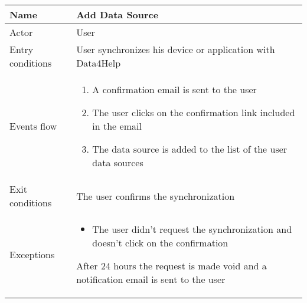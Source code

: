\begin{table}[h!]
    \begin{tabular}{|l|p{12cm}|}
        \hline
        Name             & Add Data Source \\ \hline
        Actor            & User \\ \hline
        Entry conditions & User synchronizes his device or application with Data4Help \\ \hline
        Events flow      & 
        \begin{enumerate}
            \item A confirmation email is sent to the user
            \item The user clicks on the confirmation link included in the email
            \item The data source is added to the list of the user data sources
        \end{enumerate} \\ \hline
        Exit conditions  & The user confirms the synchronization \\ \hline
        Exceptions       & 
        \begin{itemize}
            \item The user didn't request the synchronization and doesn't click on the confirmation
        \end{itemize} 
        After 24 hours the request is made void and a notification email is sent to the user \\ \hline 
    \end{tabular} 
\end{table}

\newpage

